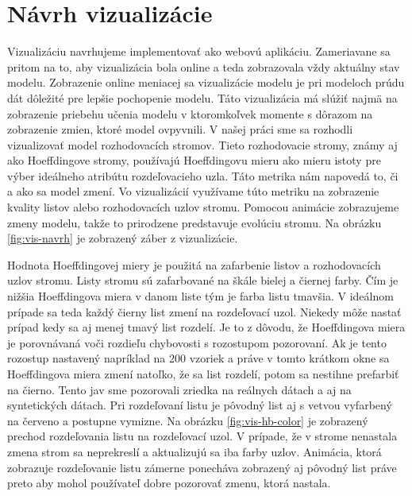 \section{Návrh vizualizácie}
\label{navrh-vizualizacie}
Vizualizáciu navrhujeme implementovať ako webovú aplikáciu. Zameriavane sa pritom na to, aby vizualizácia bola online a teda zobrazovala vždy aktuálny stav modelu. Zobrazenie online meniacej sa vizualizácie modelu je pri modeloch prúdu dát dôležité pre lepšie pochopenie modelu. Táto vizualizácia má slúžiť najmä na zobrazenie priebehu učenia modelu v ktoromkoľvek momente s dôrazom na zobrazenie zmien, ktoré model ovpyvnili. V našej práci sme sa rozhodli vizualizovať model rozhodovacích stromov. Tieto rozhodovacie stromy, známy aj ako Hoeffdingove stromy, používajú Hoeffdingovu mieru ako mieru istoty pre výber ideálneho atribútu rozdeľovacieho uzla. Táto metrika nám napovedá to, či a ako sa model zmení. Vo vizualizácií využívame túto metriku na zobrazenie kvality listov alebo rozhodovacích uzlov stromu. Pomocou animácie zobrazujeme zmeny modelu, takže to prirodzene predstavuje evolúciu stromu. Na obrázku \ref{fig:vis-navrh} je zobrazený záber z vizualizácie.
\label{fig:vis-navrh}
\par
Hodnota Hoeffdingovej miery je použitá na zafarbenie listov a rozhodovacích uzlov stromu. Listy stromu sú zafarbované na škále bielej a čiernej farby. Čím je nižšia Hoeffdingova miera v danom liste tým je farba listu tmavšia. V ideálnom prípade sa teda každý čierny list zmení na rozdeľovací uzol. Niekedy môže nastať prípad kedy sa aj menej tmavý list rozdelí. Je to z dôvodu, že Hoeffdingova miera je porovnávaná voči rozdieľu chybovosti s rozostupom pozorovaní. Ak je tento rozostup nastavený napríklad na 200 vzoriek a práve v tomto krátkom okne sa Hoeffdingova miera zmení natoľko, že sa list rozdelí, potom sa nestihne prefarbiť na čierno. Tento jav sme pozorovali zriedka na reálnych dátach a aj na syntetických dátach. Pri rozdeľovaní listu je pôvodný list aj s vetvou vyfarbený na červeno a postupne vymizne. Na obrázku \ref{fig:vis-hb-color} je zobrazený prechod rozdeľovania listu na rozdeľovací uzol. V prípade, že v strome nenastala zmena strom sa neprekreslí a aktualizujú sa iba farby uzlov. Animácia, ktorá zobrazuje rozdeľovanie listu zámerne ponecháva zobrazený aj pôvodný list práve preto aby mohol používateľ dobre pozorovať zmenu, ktorá nastala.
